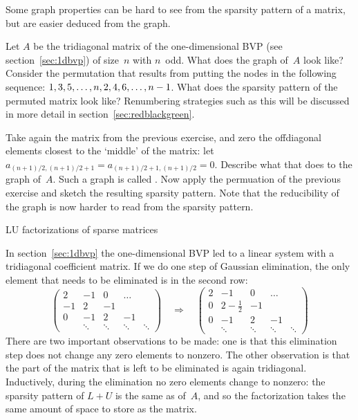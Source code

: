 Some graph properties can be hard to see from the sparsity pattern of
a matrix, but are easier deduced from the graph.

\begin{exercise}
  \label{ex:rb-tridiagonal}
  Let $A$ be the tridiagonal matrix of the one-dimensional \ac{BVP}
  (see section~\ref{sec:1dbvp}) of size~$n$ with $n$~odd. What does
  the graph of~$A$ look like?  Consider the permutation that results
  from putting the nodes in the following sequence:
  $1,3,5,\ldots,n,2,4,\allowbreak6,\ldots,\allowbreak n-\nobreak
  1$. What does the sparsity pattern of the permuted matrix look like?
  Renumbering strategies such as this will be discussed in more detail
  in section~\ref{sec:redblackgreen}.
\end{exercise}

\begin{exercise}
  \label{ex:reducible-tridiagonal}
  Take again the matrix from the previous exercise, and zero the
  offdiagonal elements closest to the `middle' of the matrix: let
  $a_{(n+1)/2,(n+1)/2+1}=a_{(n+1)/2+1,(n+1)/2}=0$. Describe what that
  does to the graph of~$A$. Such a graph is called
  . Now apply the permuation of the previous
  exercise and sketch the resulting sparsity pattern. Note that the
  reducibility of the graph is now harder to read from the sparsity
  pattern.
\end{exercise}

 {LU factorizations of sparse matrices}
\label{sec:fill}

In section~\ref{sec:1dbvp} the one-dimensional \ac{BVP} led to a
linear system with a tridiagonal coefficient matrix. If we do one
step of Gaussian elimination, the only element that needs to be
eliminated is in the second row:
\[
\begin{pmatrix}
  2&-1&0&\ldots\\ -1&2&-1\\ 0&-1&2&-1\\ 
  &\ddots&\ddots&\ddots&\ddots
\end{pmatrix}
\quad\Rightarrow\quad
\left(\begin{array}{c|cccc}
  2&-1&0&\ldots\\ \hline 0&2-\frac12&-1\\ 0&-1&2&-1\\ 
  &\ddots&\ddots&\ddots&\ddots
\end{array}\right)
\]
There are two important observations to be
made: one is that this elimination step does not change any zero
elements to nonzero. The other observation is that the part of the
matrix that is left to be eliminated is again
tridiagonal. Inductively, during the elimination no zero elements
change to nonzero: the sparsity pattern of $L+U$ is the same as
of~$A$, and so the factorization takes the same amount of space to
store as the matrix.


